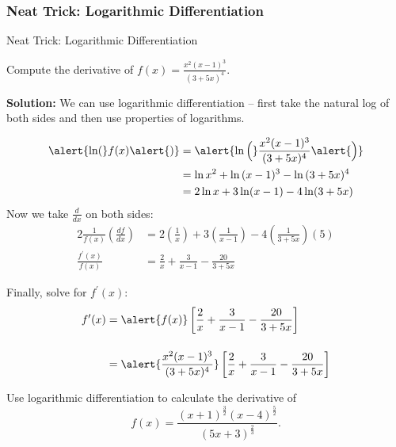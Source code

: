 \documentclass[cal1spr16Lectures.tex]{subfiles}
\begin{document}
\subsubsection{Neat Trick: Logarithmic Differentiation}

\begin{frame}{\small Neat Trick: Logarithmic Differentiation}
\begin{ex}  Compute the derivative of $f(x)=\frac{x^2(x-1)^3}{(3+5x)^4}$. \end{ex}
{\bf Solution:} We can use logarithmic differentiation -- first take the natural log of both sides and then use properties of logarithms.
\end{frame}

\begin{frame}\footnotesize
\begin{alignat*}{2}
\alert{\ln(}f(x)\alert{)} &= \alert{\ln \Big(} \frac{x^2(x-1)^3}{(3+5x)^4} \alert{\Big)} \\%
&= \ln{x^2} + \ln{(x-1)^3}-\ln{(3+5x)^4} \\%
&= 2\ln x + 3\ln(x-1)-4\ln(3+5x)
\end{alignat*}
\alert{Now} we take $\textstyle\frac{d}{dx}$ on both sides:
\begin{alignat*}{2}
\frac{1}{f(x)}\left(\frac{df}{dx}\right) &= 2\left(\frac{1}{x}\right) + 3\left(\frac{1}{x-1}\right) - 4\left(\frac{1}{3+5x}\right)(5) \\[1pc]
\frac{f^{\prime}(x)}{f(x)} &= \frac{2}{x} + \frac{3}{x-1} - \frac{20}{3+5x}
\end{alignat*}
\end{frame}

\begin{frame}{}
Finally, solve for $f^{\prime}(x)$:
\begin{alignat*}{2}
f^{\prime}(x) &= \alert{f(x)} \left[ \frac{2}{x} + \frac{3}{x-1} - \frac{20}{3+5x} \right] \\[1pc]
&= \alert{\frac{x^2 (x-1)^3}{(3+5x)^4}} \left[ \frac{2}{x} + \frac{3}{x-1} - \frac{20}{3+5x} \right]
\end{alignat*}
\end{frame}

\begin{frame}
\begin{exe}
Use logarithmic differentiation to calculate the derivative of 
\[
f(x)=\frac{(x+1)^{\frac{3}{2}}(x-4)^{\frac{5}{2}}}{(5x+3)^{\frac{2}{3}}}.
\]
\end{exe}
\end{frame}
\end{document}
